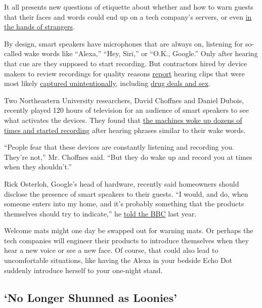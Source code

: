 It all presents new questions of etiquette about whether and how to warn
guests that their faces and words could end up on a tech company's
servers, or even
\href{https://www.nytimes3xbfgragh.onion/2019/08/21/technology/personaltech/alexa-siri-google-assistant-listen.html}{in
the hands of strangers}.

By design, smart speakers have microphones that are always on, listening
for so-called wake words like ``Alexa,'' ``Hey, Siri,'' or ``O.K.,
Google.'' Only after hearing that cue are they supposed to start
recording. But contractors hired by device makers to review recordings
for quality reasons
\href{https://www.vrt.be/vrtnws/en/2019/07/10/google-employees-are-eavesdropping-even-in-flemish-living-rooms/}{report}
hearing clips that were most likely
\href{https://www.bloomberg.com/news/articles/2019-04-10/is-anyone-listening-to-you-on-alexa-a-global-team-reviews-audio}{captured
unintentionally}, including
\href{https://www.theguardian.com/technology/2019/jul/26/apple-contractors-regularly-hear-confidential-details-on-siri-recordings}{drug
deals and sex}.

Two Northeastern University researchers, David Choffnes and Daniel
Dubois, recently played 120 hours of television for an audience of smart
speakers to see what activates the devices. They found that
\href{https://moniotrlab.ccis.neu.edu/smart-speakers-study/}{the
machines woke up dozens of times and started recording} after hearing
phrases similar to their wake words.

``People fear that these devices are constantly listening and recording
you. They're not,'' Mr. Choffnes said. ``But they do wake up and record
you at times when they shouldn't.''

Rick Osterloh, Google's head of hardware, recently said homeowners
should disclose the presence of smart speakers to their guests. ``I
would, and do, when someone enters into my home, and it's probably
something that the products themselves should try to indicate,'' he
\href{https://www.bbc.com/news/technology-50048144}{told the BBC} last
year.

Welcome mats might one day be swapped out for warning mats. Or perhaps
the tech companies will engineer their products to introduce themselves
when they hear a new voice or see a new face. Of course, that could also
lead to uncomfortable situations, like having the Alexa in your bedside
Echo Dot suddenly introduce herself to your one-night stand.

\hypertarget{no-longer-shunned-as-loonies}{%
\subsection{`No Longer Shunned as
Loonies'}\label{no-longer-shunned-as-loonies}}

